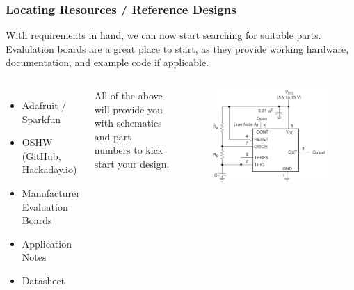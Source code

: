 \documentclass[aspectratio=169, t]{beamer}
\begin{document}
\begin{frame}
\frametitle{Locating Resources / Reference Designs}
With requirements in hand, we can now start searching for suitable parts.\\
Evalulation boards are a great place to start, as they provide working hardware, documentation, and example code if applicable.\\[10pt]
\begin{columns}
		\vspace{-7mm}
		\begin{itemize}
			\item Adafruit / Sparkfun
			\item OSHW (GitHub, Hackaday.io)
			\item Manufacturer Evaluation Boards
			\item Application Notes
			\item Datasheet
		\end{itemize}
		\vspace{2mm}
		All of the above will provide you with schematics and part numbers to kick start your design.

	\vspace{-8mm}
		\begin{figure}
			\includegraphics[width=0.8\linewidth]{images/tlc555-appnote.png}
		\end{figure}
\end{columns}
\end{frame}
\end{document}
